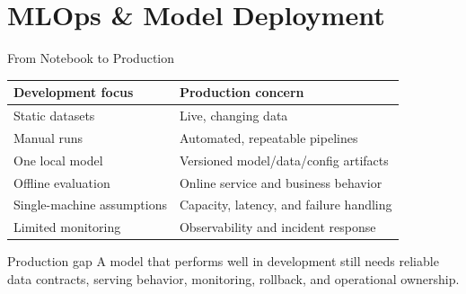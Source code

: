 %
%

\section{MLOps \& Model Deployment}


\begin{frame}{From Notebook to Production}
\begin{table}
\small
\begin{tabular}{ll}
\toprule
\textbf{Development focus} & \textbf{Production concern} \\
\midrule
Static datasets & Live, changing data \\
Manual runs & Automated, repeatable pipelines \\
One local model & Versioned model/data/config artifacts \\
Offline evaluation & Online service and business behavior \\
Single-machine assumptions & Capacity, latency, and failure handling \\
Limited monitoring & Observability and incident response \\
\bottomrule
\end{tabular}
\end{table}

\begin{alertblock}{Production gap}
A model that performs well in development still needs reliable data contracts, serving behavior, monitoring, rollback, and operational ownership.
\end{alertblock}
\end{frame}

